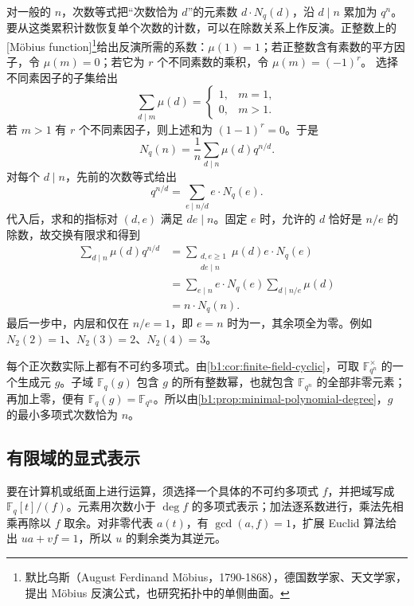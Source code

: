 \ProseParagraphBreak
对一般的 \(n\)，次数等式把“次数恰为 \(d\)”的元素数 \(d\cdot N_q(d)\)，沿 \(d\mid n\) 累加为 \(q^n\)。要从这类累积计数恢复单个次数的计数，可以在除数关系上作反演。正整数上的[Möbius function]\footnote{默比乌斯（August Ferdinand Möbius，1790-1868），德国数学家、天文学家，提出 Möbius 反演公式，也研究拓扑中的单侧曲面。}给出反演所需的系数：\(\mu(1)=1\)；若正整数含有素数的平方因子，令 \(\mu(m)=0\)；若它为 \(r\) 个不同素数的乘积，令 \(\mu(m)=(-1)^r\)。
选择不同素因子的子集给出
\[
	\sum_{d\mid m}\mu(d)=
	\begin{cases}1,&m=1,\\0,&m>1.\end{cases}
\]
若 \(m>1\) 有 \(r\) 个不同素因子，则上述和为 \((1-1)^r=0\)。于是
\begin{equation}\label{b1:eq:finite-field-irreducible-count}
	N_q(n)=\frac1n\sum_{d\mid n}\mu(d)q^{n/d}.
\end{equation}
对每个 \(d\mid n\)，先前的次数等式给出
\[
	q^{n/d}=\sum_{e\mid n/d}e\cdot N_q(e).
\]
代入后，求和的指标对 \((d,e)\) 满足 \(de\mid n\)。固定 \(e\) 时，允许的 \(d\) 恰好是 \(n/e\) 的除数，故交换有限求和得到
\[
	\begin{aligned}
		\sum_{d\mid n}\mu(d)q^{n/d} &=\sum_{\substack{d,e\ge1\\de\mid n}}\mu(d)e\cdot N_q(e)\\
		&=\sum_{e\mid n}e\cdot N_q(e)\sum_{d\mid n/e}\mu(d)\\
		&=n\cdot N_q(n).
	\end{aligned}
\]
最后一步中，内层和仅在 \(n/e=1\)，即 \(e=n\) 时为一，其余项全为零。例如 \(N_2(2)=1\)、\(N_2(3)=2\)、\(N_2(4)=3\)。

\ProseParagraphBreak
每个正次数实际上都有不可约多项式。由\cref{b1:cor:finite-field-cyclic}，可取 \(\mathbb F_{q^n}^\times\) 的一个生成元 \(g\)。子域 \(\mathbb F_q(g)\) 包含 \(g\) 的所有整数幂，也就包含 \(\mathbb F_{q^n}\) 的全部非零元素；再加上零，便有 \(\mathbb F_q(g)=\mathbb F_{q^n}\)。所以由\cref{b1:prop:minimal-polynomial-degree}，\(g\) 的最小多项式次数恰为 \(n\)。

\subsection{有限域的显式表示}
\label{b1:subsec:1703:03}

要在计算机或纸面上进行运算，须选择一个具体的不可约多项式 \(f\)，并把域写成 \(\mathbb F_q[t]/(f)\)。元素用次数小于 \(\deg f\) 的多项式表示；加法逐系数进行，乘法先相乘再除以 \(f\) 取余。对非零代表 \(a(t)\)，有 \(\gcd(a,f)=1\)，扩展 Euclid 算法给出 \(ua+vf=1\)，所以 \(u\) 的剩余类为其逆元。

